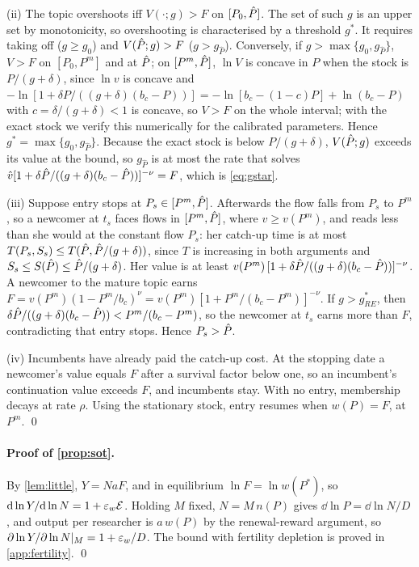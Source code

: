 (ii) The topic overshoots iff $V(\cdot;g)>F$ on $[P_0,\hat P]$. The set of such $g$
is an upper set by monotonicity, so overshooting is characterised by a
threshold $g^*$. It requires taking off ($g\ge g_0$) and $V(\hat P;g)>F$
($g>g_{\hat P}$). Conversely, if $g>\max\{g_0,g_{\hat P}\}$, $V>F$ on
$[P_0,P^m]$ and at $\hat P$; on $[P^m,\hat P]$, $\ln V$ is concave in $P$ when the
stock is $P/(g+\delta)$, since $\ln v$ is concave and
$-\ln[1+\delta P/((g+\delta)(b_c-P))]=-\ln[b_c-(1-c)P]+\ln(b_c-P)$ with
$c=\delta/(g+\delta)<1$ is concave, so $V>F$ on the whole interval; with the
exact stock we verify this numerically for the calibrated parameters. Hence
$g^*=\max\{g_0,g_{\hat P}\}$. Because the exact stock is below $P/(g+\delta)$,
$V(\hat P;g)$ exceeds its value at the bound, so $g_{\hat P}$ is at most the rate
that solves $\hat v[1+\delta\hat P/((g+\delta)(b_c-\hat P))]^{-\nu}=F$, which is
\eqref{eq:gstar}.

(iii) Suppose entry stops at $P_s\in[P^m,\hat P]$. Afterwards the flow falls
from $P_s$ to $P^m$, so a newcomer at $t_s$ faces flows in $[P^m,\hat P]$, where
$v\ge v(P^m)$, and reads less than she would at the constant flow $P_s$: her
catch-up time is at most $T(P_s,S_s)\le T(\hat P,\hat P/(g+\delta))$, since $T$ is
increasing in both arguments and $S_s\le S(\hat P)\le\hat P/(g+\delta)$. Her value is
at least $v(P^m)\,[1+\delta\hat P/((g+\delta)(b_c-\hat P))]^{-\nu}$. A newcomer to the
mature topic earns $F=v(P^m)(1-P^m/b_c)^\nu=v(P^m)[1+P^m/(b_c-P^m)]^{-\nu}$. If
$g>g^*_{RE}$, then $\delta\hat P/((g+\delta)(b_c-\hat P))<P^m/(b_c-P^m)$, so the
newcomer at $t_s$ earns more than $F$, contradicting that entry stops. Hence
$P_s>\hat P$.

(iv) Incumbents have already paid the catch-up cost. At the stopping date a
newcomer's value equals $F$ after a survival factor below one, so an
incumbent's continuation value exceeds $F$, and incumbents stay. With no entry,
membership decays at rate $\rho$. Using the stationary stock, entry resumes
when $w(P)=F$, at $P^m$. \qed

\paragraph{Proof of \cref{prop:sot}.} By \cref{lem:little}, $Y=NaF$, and in
equilibrium $\ln F=\ln w(P^*)$, so $\mathrm{d}\ln Y/\mathrm{d}\ln N=1+\varepsilon_w\mathcal E$. Holding $M$
fixed, $N=M\,n(P)$ gives $\dd\ln P=\dd\ln N/D$, and output per researcher is
$a\,w(P)$ by the renewal-reward argument, so
$\partial\ln Y/\partial\ln N|_M=1+\varepsilon_w/D$. The bound with fertility depletion is
proved in \cref{app:fertility}. \qed

